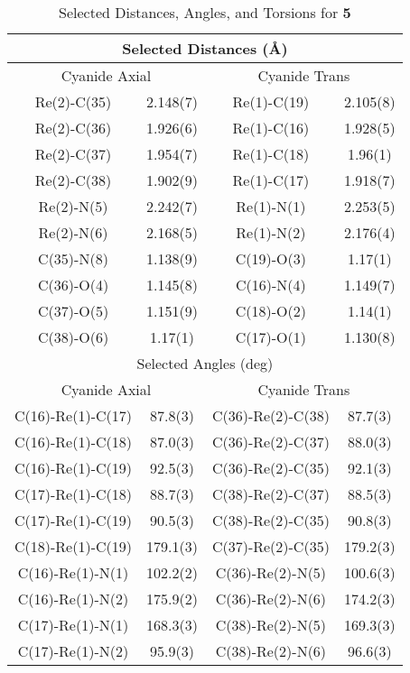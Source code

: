 \begin{table}[htbp]
  \caption{Selected Distances, Angles, and Torsions for \textbf{5}}
  \centering
    \begin{tabular}{cccc}
    \toprule
    \multicolumn{4}{c}{Selected Distances (\r{A})} \\ \midrule
    \multicolumn{2}{c}{Cyanide Axial} & \multicolumn{2}{c}{Cyanide Trans} \\ \midrule
    Re(2)-C(35) & 2.148(7) & Re(1)-C(19) & 2.105(8) \\
    Re(2)-C(36) & 1.926(6) & Re(1)-C(16) & 1.928(5) \\
    Re(2)-C(37) & 1.954(7) & Re(1)-C(18) & 1.96(1) \\
    Re(2)-C(38) & 1.902(9) & Re(1)-C(17) & 1.918(7) \\
    Re(2)-N(5) & 2.242(7) & Re(1)-N(1) & 2.253(5) \\
    Re(2)-N(6) & 2.168(5) & Re(1)-N(2) & 2.176(4) \\
    C(35)-N(8) & 1.138(9) & C(19)-O(3) & 1.17(1) \\
    C(36)-O(4) & 1.145(8) & C(16)-N(4) & 1.149(7) \\
    C(37)-O(5) & 1.151(9) & C(18)-O(2) & 1.14(1) \\
    C(38)-O(6) & 1.17(1) & C(17)-O(1) & 1.130(8) \\ \midrule
    \multicolumn{4}{c}{Selected Angles (deg)} \\ \midrule
    \multicolumn{2}{c}{Cyanide Axial} & \multicolumn{2}{c}{Cyanide Trans} \\ \midrule
    C(16)-Re(1)-C(17) & 87.8(3) & C(36)-Re(2)-C(38) & 87.7(3) \\
    C(16)-Re(1)-C(18) & 87.0(3) & C(36)-Re(2)-C(37) & 88.0(3) \\
    C(16)-Re(1)-C(19) & 92.5(3) & C(36)-Re(2)-C(35) & 92.1(3) \\
    C(17)-Re(1)-C(18) & 88.7(3) & C(38)-Re(2)-C(37) & 88.5(3)\\
    C(17)-Re(1)-C(19) & 90.5(3) & C(38)-Re(2)-C(35) & 90.8(3)\\
    C(18)-Re(1)-C(19) & 179.1(3) & C(37)-Re(2)-C(35) & 179.2(3) \\
    C(16)-Re(1)-N(1) & 102.2(2) & C(36)-Re(2)-N(5) & 100.6(3) \\
    C(16)-Re(1)-N(2) & 175.9(2) & C(36)-Re(2)-N(6) & 174.2(3) \\
    C(17)-Re(1)-N(1) & 168.3(3) & C(38)-Re(2)-N(5) & 169.3(3) \\
    C(17)-Re(1)-N(2) & 95.9(3) & C(38)-Re(2)-N(6) & 96.6(3) \\

\end{tabular}
\end{table}
